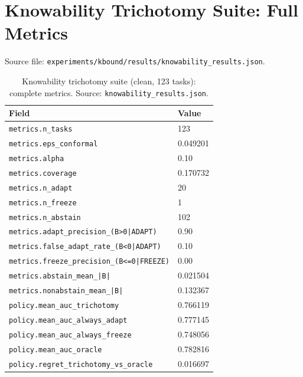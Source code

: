 \section{Knowability Trichotomy Suite: Full Metrics}
\label{sec:app-trichotomy}

Source file: \texttt{experiments/kbound/results/knowability\_results.json}.

\begin{table}[ht]
\centering
\caption{Knowability trichotomy suite (clean, 123 tasks): complete metrics.
  Source: \texttt{knowability\_results.json}.}
\label{tab:full-trichotomy}
\begin{tabular}{ll}
\toprule
Field & Value \\
\midrule
\texttt{metrics.n\_tasks}                          & 123 \\
\texttt{metrics.eps\_conformal}                    & 0.049201 \\
\texttt{metrics.alpha}                             & 0.10 \\
\texttt{metrics.coverage}                          & 0.170732 \\
\texttt{metrics.n\_adapt}                          & 20 \\
\texttt{metrics.n\_freeze}                         & 1 \\
\texttt{metrics.n\_abstain}                        & 102 \\
\texttt{metrics.adapt\_precision\_(B>0|ADAPT)}     & 0.90 \\
\texttt{metrics.false\_adapt\_rate\_(B\textless{}0|ADAPT)} & 0.10 \\
\texttt{metrics.freeze\_precision\_(B\textless{}=0|FREEZE)} & 0.00 \\
\texttt{metrics.abstain\_mean\_|B|}                & 0.021504 \\
\texttt{metrics.nonabstain\_mean\_|B|}             & 0.132367 \\
\midrule
\texttt{policy.mean\_auc\_trichotomy}              & 0.766119 \\
\texttt{policy.mean\_auc\_always\_adapt}           & 0.777145 \\
\texttt{policy.mean\_auc\_always\_freeze}          & 0.748056 \\
\texttt{policy.mean\_auc\_oracle}                  & 0.782816 \\
\texttt{policy.regret\_trichotomy\_vs\_oracle}     & 0.016697 \\

\end{tabular}
\end{table}
